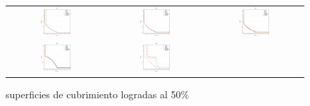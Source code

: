 \begin{figure}[H]
\caption{superficies de cubrimiento logradas al 50\%}%
\begin{tabular}{ccc}
  \includegraphics[width=0.33\textwidth]{Figures_Chapter7/Results_Chapter4/Surface_Representative/UF1.eps}  &
  \includegraphics[width=0.33\textwidth]{Figures_Chapter7/Results_Chapter4/Surface_Representative/UF2.eps} &
  \includegraphics[width=0.33\textwidth]{Figures_Chapter7/Results_Chapter4/Surface_Representative/UF3.eps} \\
  \includegraphics[width=0.33\textwidth]{Figures_Chapter7/Results_Chapter4/Surface_Representative/UF4.eps} &
  \includegraphics[width=0.33\textwidth]{Figures_Chapter7/Results_Chapter4/Surface_Representative/UF5.eps} &

\end{tabular}
\end{figure}
